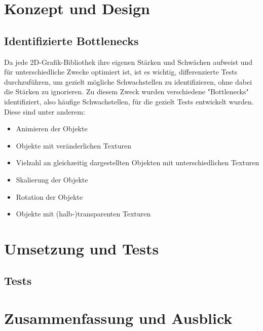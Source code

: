 \chapter{Konzept und Design}
\section{Identifizierte Bottlenecks}
Da jede 2D-Grafik-Bibliothek ihre eigenen St\"arken und Schw\"achen aufweist und für unterschiedliche Zwecke optimiert ist, ist es wichtig, differenzierte Tests durchzuf\"uhren, um gezielt m\"ogliche Schwachstellen zu identifizieren, ohne dabei die St\"arken zu ignorieren. Zu diesem Zweck wurden verschiedene "Bottlenecks" identifiziert, also h\"aufige Schwachstellen, für die gezielt Tests entwickelt wurden. Diese sind unter anderem:\\
\begin{itemize} 
\item Animieren der Objekte
\item Objekte mit ver\"anderlichen Texturen
\item Vielzahl an gleichzeitig dargestellten Objekten mit unterschiedlichen Texturen
\item Skalierung der Objekte
\item Rotation der Objekte
\item Objekte mit (halb-)transparenten Texturen
\end{itemize}

\chapter{Umsetzung und Tests}
\section{Tests}
\label{sec:tests}

\chapter{Zusammenfassung und Ausblick}

